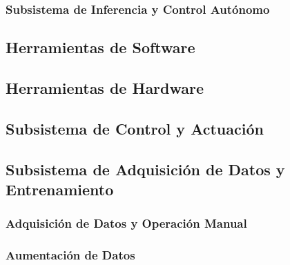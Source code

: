 \documentclass[]{beamer}
\begin{document}
            \subsubsection*{Subsistema de Inferencia y Control Autónomo}
            \begin{frame}
            \end{frame}
        

        \subsection{Herramientas de Software}
        \begin{frame}
        \end{frame}

        \subsection{Herramientas de Hardware}
        \begin{frame}
        \end{frame}

        \subsection{Subsistema de Control y Actuación}
        \begin{frame}
        \end{frame}

        \subsection{Subsistema de Adquisición de Datos y Entrenamiento}
            \subsubsection*{Adquisición de Datos y Operación Manual}
            \begin{frame}
            \end{frame}

            \subsubsection*{Aumentación de Datos}
            \begin{frame}
            \end{frame}
\end{document}
